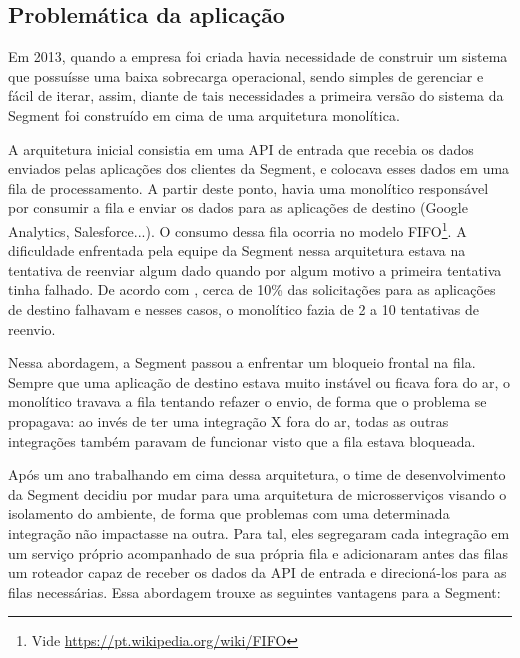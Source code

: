 \subsection{Problemática da aplicação}

Em 2013, quando a empresa foi criada havia necessidade de construir um sistema que possuísse uma
baixa sobrecarga operacional, sendo simples de gerenciar e fácil de iterar, assim, diante de tais
necessidades a primeira versão do sistema da Segment foi construído em cima de uma arquitetura monolítica.

A arquitetura inicial consistia em uma \gls{API} de entrada que recebia os dados enviados pelas aplicações dos
clientes da Segment, e colocava esses dados em uma fila de processamento. A partir deste ponto,
havia uma monolítico responsável por consumir a fila e enviar os dados para as aplicações de destino
(Google Analytics, Salesforce...). O consumo dessa fila ocorria no modelo \gls{FIFO}\footnote{Vide
\url{https://pt.wikipedia.org/wiki/FIFO}}. A dificuldade enfrentada pela equipe da Segment nessa
arquitetura estava na tentativa de reenviar algum dado quando por algum motivo a primeira tentativa
tinha falhado. De acordo com , cerca de 10\% das
solicitações para as aplicações de destino falhavam e nesses casos, o monolítico fazia de 2 a 10
tentativas de reenvio.

Nessa abordagem, a Segment passou a enfrentar um bloqueio frontal na fila. Sempre que uma aplicação
de destino estava muito instável ou ficava fora do ar, o monolítico travava a fila tentando refazer
o envio, de forma que o problema se propagava: ao invés de ter uma integração X fora do ar, todas as
outras integrações também paravam de funcionar visto que a fila estava bloqueada.

Após um ano trabalhando em cima dessa arquitetura, o time de desenvolvimento da Segment decidiu por
mudar para uma arquitetura de microsserviços visando o isolamento do ambiente, de forma que
problemas com uma determinada integração não impactasse na outra. Para tal, eles segregaram cada
integração em um serviço próprio acompanhado de sua própria fila e adicionaram antes das filas um
roteador capaz de receber os dados da \gls{API} de entrada e direcioná-los para as filas necessárias.
Essa abordagem trouxe as seguintes vantagens para a Segment:

